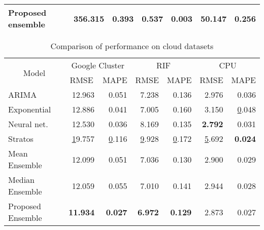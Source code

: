 \begin{table}[]
\begin{tabular}{|l|l|r|r|r|r|r|}
Proposed ensemble                                     & \textbf{356.315}        & \textbf{0.393} & 0.537 & \textbf{0.003} &  50.147 & 0.256 \\ \hline
\end{tabular}
\end{table}

\begin{table}[]
\centering
\caption{Comparison of performance on cloud datasets}
\label{my-label}
\begin{tabular}{|l|r|r|r|r|r|r|}
\hline
\multicolumn{1}{|c|}{\multirow{2}{*}{Model}} & \multicolumn{2}{c|}{Google Cluster}                   & \multicolumn{2}{c|}{RIF}                              & \multicolumn{2}{c|}{CPU}                              \\ \cline{2-7} 
\multicolumn{1}{|c|}{}                       & \multicolumn{1}{c|}{RMSE} & \multicolumn{1}{c|}{MAPE} & \multicolumn{1}{c|}{RMSE} & \multicolumn{1}{c|}{MAPE} & \multicolumn{1}{c|}{RMSE} & \multicolumn{1}{c|}{MAPE} \\ \hline
ARIMA                                        & 12.963                    & 0.051                     & 7.238                     & 0.136                     & 2.976                     & 0.036                     \\ \hline
Exponential                                  & 12.886                    & 0.041                     & 7.005                     & 0.160                     & 3.150                     & {\ul 0.048}               \\ \hline
Neural net.                                  & 12.530                    & 0.036                     & 8.169                     & 0.135                     & \textbf{2.792}            & 0.031                     \\ \hline
Stratos                                      & {\ul 19.757}              & {\ul 0.116}               & {\ul 9.928}               & {\ul 0.172}               & {\ul 5.692}               & \textbf{0.024}            \\ \hline
Mean Ensemble                                      & 12.099              & 0.051               & 7.036               & 0.130               & 2.900               & 0.029            \\ \hline
Median Ensemble                                      &  12.059              & 0.055               &  7.010               & 0.141               & 2.944               & 0.028            \\ \hline

Proposed Ensemble                                     & \textbf{11.934}           & \textbf{0.027}            & \textbf{6.972}            & \textbf{0.129}            & 2.873                     & 0.027                     \\ \hline
\end{tabular}
\end{table}

